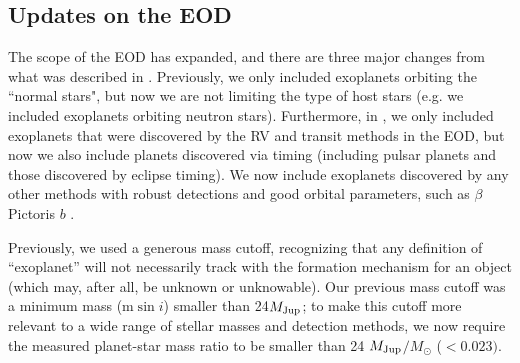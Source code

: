 \documentclass[11pt,preprint]{aastex}
\def\msun{M_{\odot}}
\def\mjup{$M_{\rm Jup}$}
\begin{document}
\begin{CJK*}{UTF8}{gbsn}
\begin{comment}
As the number of exoplanet discoveries keeps rising, it is important
to keep track of these discoveries and cataloging the orbital
parameters and host star properties of exoplanet systems. There are
several entities that are devoted to this effort, including the
Exoplanet Orbit Database (EOD) and Exoplanets Data Explorer\footnote{See
  \url{http://exoplanets.org}.} \citep{Wright2011}, the Extrasolar
Planets Encyclopaedia\footnote{See \url{http://exoplanet.eu}.}
\citep{Schneider2011}, the NASA Exoplanet Archive\footnote{See
  \url{http://exoplanetarchive.ipac.caltech.edu}.}
\citep{Akeson2013}, and so on.

This paper describes the continuing efforts since \cite{Wright2011} to
maintain the EOD and the Exoplanets Data Explorer at exoplanets.org.

The efforts of keeping track of exoplanet discoveries are being
carried out by several entities, and most notably, the Extrasolar
Planets Encyclopaedia\footnote{See \url{http://exoplanet.eu}.}
\citep{Schneider2011}, the NASA Exoplanet Archive\footnote{See
  \url{http://exoplanetarchive.ipac.caltech.edu}.}
\citep{Akeson2013}, and the Exoplanet Orbit Database (EOD) and
Exoplanets Data Explorer\footnote{See \url{http://exoplanets.org}.}
\citep{Wright2011}.
\end{comment}


\section{Updates on the EOD}\label{sec:update}

The scope of the EOD has expanded, and there are three major changes
from what was described in \cite{Wright2011}. Previously, we only
included exoplanets orbiting the ``normal stars", but now we are not
limiting the type of host stars (e.g. we included exoplanets orbiting
neutron stars). Furthermore, in \cite{Wright2011}, we only included
exoplanets that were discovered by the RV and transit methods in the
EOD, but now we also include planets discovered via timing (including
pulsar planets and those discovered by eclipse timing). We now include
exoplanets discovered by any other methods with robust detections and
good orbital parameters, such as $\beta$ Pictoris $b$
\citep{Chauvin2012,Nielsen2014,Macintosh2014}.  

Previously, we used a generous mass cutoff, recognizing that any
definition of ``exoplanet'' will not necessarily track with the
formation mechanism for an object (which may, after all, be unknown or
unknowable).  Our previous mass cutoff was a minimum mass (m$\sin{i}$)
smaller than 24\mjup; to make this cutoff more relevant to a wide
range of stellar masses and detection methods, we now require the measured
planet-star mass ratio to be smaller than 24 \mjup$/\msun$ ($< 0.023)$.


\end{CJK*}
\end{document}
